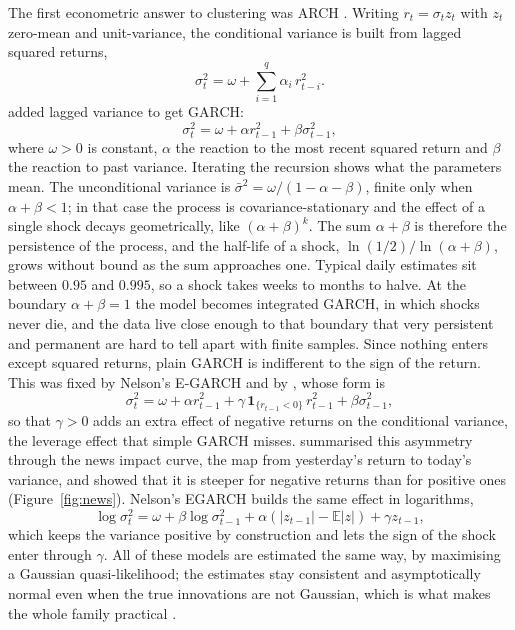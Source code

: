 \documentclass[12pt,a4paper]{article}
\begin{document}
The first econometric answer to clustering was ARCH \citep{engle1982}.
Writing $r_t = \sigma_t z_t$ with $z_t$ zero-mean and unit-variance, the
conditional variance is built from lagged squared returns,
\begin{equation}
\sigma_t^2 = \omega + \sum_{i=1}^{q} \alpha_i\, r_{t-i}^2 .
\end{equation}
\citet{bollerslev1986} added lagged variance to get GARCH:
\begin{equation}
\sigma_t^2 = \omega + \alpha r_{t-1}^2 + \beta \sigma_{t-1}^2,
\end{equation}
where $\omega > 0$ is constant, $\alpha$ the reaction to the most recent
squared return and $\beta$ the reaction to past variance. Iterating the recursion shows what the parameters mean. The
unconditional variance is $\bar\sigma^2 = \omega/(1-\alpha-\beta)$,
finite only when $\alpha+\beta<1$; in that case the process is
covariance-stationary and the effect of a single shock decays
geometrically, like $(\alpha+\beta)^k$. The sum $\alpha+\beta$ is
therefore the persistence of the process, and the half-life of a shock,
$\ln(1/2)/\ln(\alpha+\beta)$, grows without bound as the sum approaches
one. Typical daily estimates sit between $0.95$ and $0.995$, so a shock
takes weeks to months to halve. At the boundary $\alpha+\beta=1$ the
model becomes integrated GARCH, in which shocks never die, and the data
live close enough to that boundary that very persistent and permanent
are hard to tell apart with finite samples. Since nothing enters except squared
returns, plain GARCH is indifferent to the sign of the return. This was
fixed by Nelson's E-GARCH \citep{nelson1991} and by
\citet{gjr1993}, whose form is
\begin{equation}
\sigma_t^2 = \omega + \alpha r_{t-1}^2
+ \gamma\, \mathbf{1}_{\{r_{t-1} < 0\}}\, r_{t-1}^2
+ \beta \sigma_{t-1}^2 ,
\end{equation}
so that $\gamma > 0$ adds an extra effect of negative returns on the
conditional variance, the leverage effect that simple GARCH misses.
\citet{engleng1993} summarised this asymmetry through the news impact
curve, the map from yesterday's return to today's variance, and showed
that it is steeper for negative returns than for positive ones
(Figure~\ref{fig:news}). Nelson's EGARCH \citep{nelson1991} builds the
same effect in logarithms,
\begin{equation}
\log \sigma_t^2 = \omega + \beta \log \sigma_{t-1}^2
+ \alpha \left(|z_{t-1}| - \mathbb{E}|z|\right) + \gamma z_{t-1},
\end{equation}
which keeps the variance positive by construction and lets the sign of
the shock enter through $\gamma$. All of these models are estimated the
same way, by maximising a Gaussian quasi-likelihood; the estimates stay
consistent and asymptotically normal even when the true innovations are
not Gaussian, which is what makes the whole family practical
\citep{bollerslevwooldridge1992}.
\end{document}
